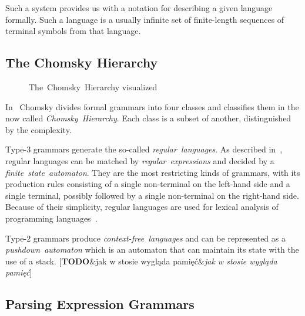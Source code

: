 \documentclass[english,engineering]{wizthesis}
\newcommand{\todo}[1]{%
  {\color{red}[\textbf{TODO}\ifx&#1&{}\else{ }\fi\emph{#1}]}%
}
\begin{document}
Such a system provides us with a notation for describing a given
language formally. Such a language is a usually infinite set of finite-length
sequences of terminal symbols from that language.

\subsection{The Chomsky Hierarchy}

\begin{wrapfigure}{R}{0.45\textwidth}
  \centering
  \caption{The~Chomsky~Hierarchy visualized}
  \label{fig:chomsky-hierarchy}
\end{wrapfigure}

In~\cite{chomsky-1956} Chomsky divides formal grammars into four classes and
classifies them in the now called \emph{Chomsky~Hierarchy}. Each class is a
subset of another, distinguished by the complexity.

Type-3 grammars generate the so-called \emph{regular~languages}. As described
in~\cite{aho-1990}, regular languages can be matched by
\emph{regular~expressions} and decided by a \emph{finite~state~automaton}.
They are the most restricting kinds of grammars, with its production rules
consisting of a single non-terminal on the left-hand side and a single terminal,
possibly followed by a single non-terminal on the right-hand side. Because of
their simplicity, regular languages are used for lexical analysis of programming
languages~\cite{johnson-1968}.

Type-2 grammars produce \emph{context-free~languages} and can be represented
as a \emph{pushdown~automaton} which is an automaton that can maintain its
state with the use of a stack. \todo{jak w stosie wygląda pamięć}

\subsection{Parsing Expression Grammars}
\end{document}
